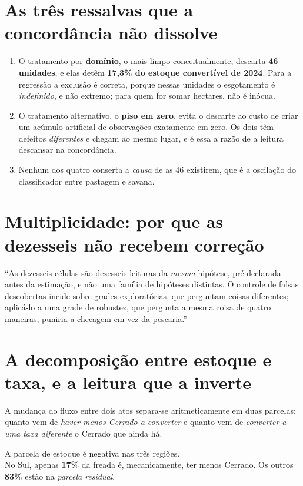 \section{As três ressalvas que a concordância não dissolve}

\begin{enumerate}
\item O tratamento por \textbf{domínio}, o mais limpo conceitualmente, descarta
\textbf{46 unidades}, e elas detêm \textbf{17,3\% do estoque convertível de
2024}. Para a regressão a exclusão é correta, porque nessas unidades o
esgotamento é \emph{indefinido}, e não extremo; para quem for somar hectares,
não é inócua.
\item O tratamento alternativo, o \textbf{piso em zero}, evita o descarte ao
custo de criar um acúmulo artificial de observações exatamente em zero. Os dois
têm defeitos \emph{diferentes} e chegam ao mesmo lugar, e é essa a razão de a
leitura descansar na concordância.
\item Nenhum dos quatro conserta a \emph{causa} de as 46 existirem, que é a
oscilação do classificador entre pastagem e savana.
\end{enumerate}

\section{Multiplicidade: por que as dezesseis não recebem correção}

\begin{nabanca}
``As dezesseis células são dezesseis leituras da \emph{mesma} hipótese,
pré-declarada antes da estimação, e não uma família de hipóteses distintas. O
controle de falsas descobertas incide sobre grades exploratórias, que perguntam
coisas diferentes; aplicá-lo a uma grade de robustez, que pergunta a mesma coisa
de quatro maneiras, puniria a checagem em vez da pescaria.''
\end{nabanca}

\section{A decomposição entre estoque e taxa, e a leitura que a inverte}

A mudança do fluxo entre dois atos separa-se aritmeticamente em duas parcelas:
quanto vem de \emph{haver menos Cerrado a converter} e quanto vem de
\emph{converter a uma taxa diferente} o Cerrado que ainda há.

\begin{ancora}
A parcela de estoque é negativa nas três regiões. \\
No Sul, apenas \textbf{17\%} da freada é, mecanicamente, ter menos Cerrado. Os
outros \textbf{83\%} estão na \emph{parcela residual}.
\end{ancora}

